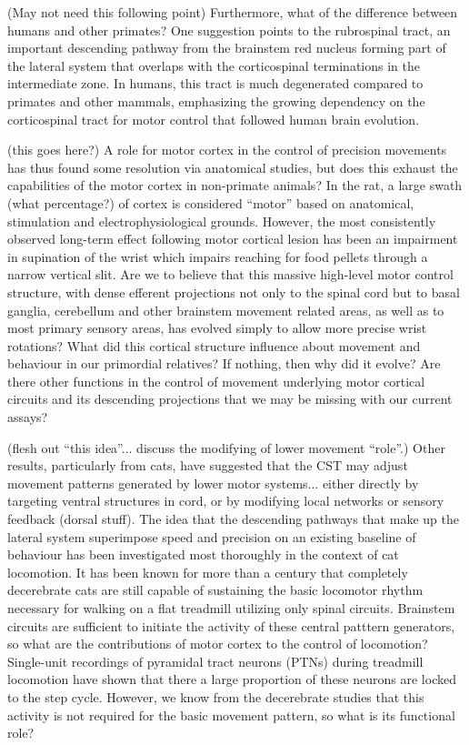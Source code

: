 (May not need this following point) Furthermore, what of the difference between humans and other primates? One suggestion points to the rubrospinal tract, an important descending pathway from the brainstem red nucleus forming part of the lateral system that overlaps with the corticospinal terminations in the intermediate zone. In humans, this tract is much degenerated compared to primates and other mammals, emphasizing the growing dependency on the corticospinal tract for motor control that followed human brain evolution.

(this goes here?)
A role for motor cortex in the control of precision movements has thus found some resolution via anatomical studies, but does this exhaust the capabilities of the motor cortex in non-primate animals? In the rat, a large swath (what percentage?) of cortex is considered ``motor'' based on anatomical, stimulation and electrophysiological grounds. However, the most consistently observed long-term effect following motor cortical lesion has been an impairment in supination of the wrist which impairs reaching for food pellets through a narrow vertical slit. Are we to believe that this massive high-level motor control structure, with dense efferent projections not only to the spinal cord but to basal ganglia, cerebellum and other brainstem movement related areas, as well as to most primary sensory areas, has evolved simply to allow more precise wrist rotations? What did this cortical structure influence about movement and behaviour in our primordial relatives? If nothing, then why did it evolve? Are there other functions in the control of movement underlying motor cortical circuits and its descending projections that we may be missing with our current assays?




(flesh out ``this idea''... discuss the modifying of lower movement ``role''.)
Other results, particularly from cats, have suggested that the CST may adjust movement patterns generated by lower motor systems... either directly by targeting ventral structures in cord, or by modifying local networks or sensory feedback (dorsal stuff).
The idea that the descending pathways that make up the lateral system superimpose speed and precision on an existing baseline of behaviour has been investigated most thoroughly in the context of cat locomotion. It has been known for more than a century that completely decerebrate cats are still capable of sustaining the basic locomotor rhythm necessary for walking on a flat treadmill utilizing only spinal circuits. Brainstem circuits are sufficient to initiate the activity of these central patttern generators, so what are the contributions of motor cortex to the control of locomotion? Single-unit recordings of pyramidal tract neurons (PTNs) during treadmill locomotion have shown that there a large proportion of these neurons are locked to the step cycle. However, we know from the decerebrate studies that this activity is not required for the basic movement pattern, so what is its functional role?

